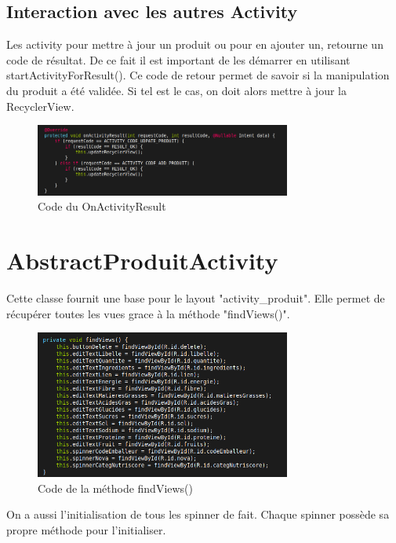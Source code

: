 \documentclass[report]{BetterDocument}
\begin{document}
			\subsection{Interaction avec les autres Activity}

				Les activity pour mettre à jour un produit ou pour en ajouter un, retourne un code de résultat. De ce fait il est important de les démarrer en utilisant startActivityForResult(). Ce code de retour permet de savoir si la manipulation du produit a été validée. Si tel est le cas, on doit alors mettre à jour la RecyclerView.

				\begin{figure}[H]
					\centering\includegraphics[width=0.75\textwidth, keepaspectratio]{img/activity/MainActivity/onactivityresult.png}
					\caption{Code du OnActivityResult}
				\end{figure}

		\section{AbstractProduitActivity}

			Cette classe fournit une base pour le layout "activity\_produit". Elle permet de récupérer toutes les vues grace à la méthode "findViews()".

			\begin{figure}[H]
				\centering\includegraphics[width=0.75\textwidth, keepaspectratio]{img/activity/AbstractProduitActivity/findviews.png}
				\caption{Code de la méthode findViews()}
			\end{figure}

			On a aussi l'initialisation de tous les spinner de fait. Chaque spinner possède sa propre méthode pour l'initialiser.
\end{document}
